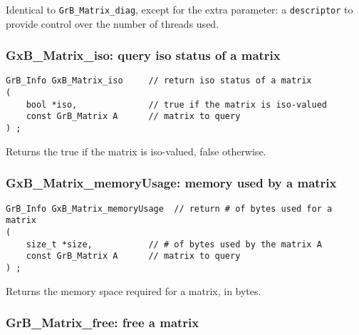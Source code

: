 \documentclass[12pt]{article}
\begin{document}
Identical to \verb'GrB_Matrix_diag', except for the extra parameter:
a \verb'descriptor' to provide control over the number of threads used.

\newpage
\subsubsection{{\sf GxB\_Matrix\_iso:} query iso status of a matrix}
\label{matrix_iso}

\begin{mdframed}[userdefinedwidth=6in]
{\footnotesize
\begin{verbatim}
GrB_Info GxB_Matrix_iso     // return iso status of a matrix
(
    bool *iso,              // true if the matrix is iso-valued
    const GrB_Matrix A      // matrix to query
) ;
\end{verbatim} } \end{mdframed}

Returns the true if the matrix is iso-valued, false otherwise.

\subsubsection{{\sf GxB\_Matrix\_memoryUsage:} memory used by a matrix}
\label{matrix_memusage}

\begin{mdframed}[userdefinedwidth=6in]
{\footnotesize
\begin{verbatim}
GrB_Info GxB_Matrix_memoryUsage  // return # of bytes used for a matrix
(
    size_t *size,           // # of bytes used by the matrix A
    const GrB_Matrix A      // matrix to query
) ;
\end{verbatim} } \end{mdframed}

Returns the memory space required for a matrix, in bytes.

\subsubsection{{\sf GrB\_Matrix\_free:} free a matrix}
\label{matrix_free}
\end{document}
